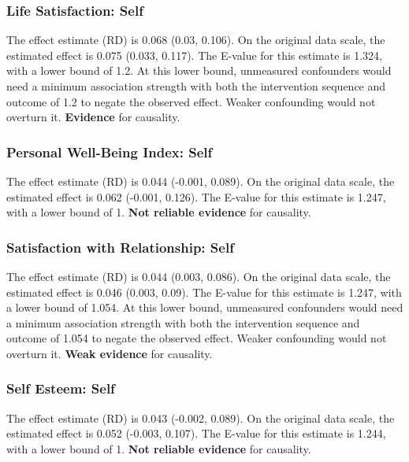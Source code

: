 \documentclass[
  singlecolumn]{article}
\begin{document}
\subsubsection{Life Satisfaction: Self}\label{life-satisfaction-self-8}

The effect estimate (RD) is 0.068 (0.03, 0.106). On the original data
scale, the estimated effect is 0.075 (0.033, 0.117). The E-value for
this estimate is 1.324, with a lower bound of 1.2. At this lower bound,
unmeasured confounders would need a minimum association strength with
both the intervention sequence and outcome of 1.2 to negate the observed
effect. Weaker confounding would not overturn it. \textbf{Evidence} for
causality.

\subsubsection{Personal Well-Being Index:
Self}\label{personal-well-being-index-self-8}

The effect estimate (RD) is 0.044 (-0.001, 0.089). On the original data
scale, the estimated effect is 0.062 (-0.001, 0.126). The E-value for
this estimate is 1.247, with a lower bound of 1. \textbf{Not reliable
evidence} for causality.

\subsubsection{Satisfaction with Relationship:
Self}\label{satisfaction-with-relationship-self-8}

The effect estimate (RD) is 0.044 (0.003, 0.086). On the original data
scale, the estimated effect is 0.046 (0.003, 0.09). The E-value for this
estimate is 1.247, with a lower bound of 1.054. At this lower bound,
unmeasured confounders would need a minimum association strength with
both the intervention sequence and outcome of 1.054 to negate the
observed effect. Weaker confounding would not overturn it. \textbf{Weak
evidence} for causality.

\subsubsection{Self Esteem: Self}\label{self-esteem-self-8}

The effect estimate (RD) is 0.043 (-0.002, 0.089). On the original data
scale, the estimated effect is 0.052 (-0.003, 0.107). The E-value for
this estimate is 1.244, with a lower bound of 1. \textbf{Not reliable
evidence} for causality.
\end{document}
